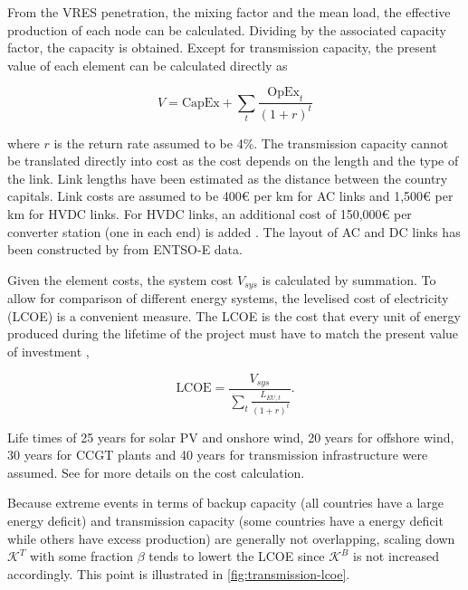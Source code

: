 \documentclass[a4paper, 5p, sort&compress]{elsarticle}%
\newcommand{\paren}[1]{\left(#1\right)}
\begin{document}
From the VRES penetration, the mixing factor and the mean load, the
effective production of each node can be calculated. Dividing by the
associated capacity factor, the capacity is obtained. Except for
transmission capacity, the present value of each element can be
calculated directly as

\begin{equation}
  \label{eq:6}
  V = \text{CapEx} + \sum_{t} \frac{\text{OpEx}_{t}}{\paren{1 + r}^{t}}
\end{equation}

where $r$ is the return rate assumed to be 4\%. The transmission
capacity cannot be translated directly into cost as the cost depends
on the length and the type of the link. Link lengths have been
estimated as the distance between the country capitals. Link costs are
assumed to be 400\euro{}
per km for AC links and 1,500\euro{}
per km for HVDC links. For HVDC links, an additional cost of
150,000\euro{}
per converter station (one in each end) is
added \cite{McKinsey, Schaber, Schaber2}. The layout of AC and
DC links has been constructed by \cite{rolando2014} from ENTSO-E data.


Given the element costs, the system cost $V_{sys}$ is calculated by
summation. To allow for comparison of different energy systems, the
levelised cost of electricity (LCOE) is a convenient measure. The LCOE
is the cost that every unit of energy produced during the lifetime of
the project must have to match the present value of
investment \cite{Short1995},

\begin{equation}
  \label{eq:7}
  \text{LCOE} = \frac{V_{sys}}{\sum_{t} \frac{L_{EU,
        t}}{\paren{1+r}^{t}}} .
\end{equation}

Life times of 25 years for solar PV and onshore wind, 20 years for
offshore wind, 30 years for CCGT plants and 40 years for transmission
infrastructure were assumed. See \cite{Sensitivity} for more details
on the cost calculation.

Because extreme events in terms of backup capacity (all countries have
a large energy deficit) and transmission capacity (some countries have
a energy deficit while others have excess production) are generally
not overlapping, scaling down $\mathcal{K}^{T}$ with some fraction
$\beta$ tends to lowert the LCOE since $\mathcal{K}^{B}$ is not increased
accordingly. This point is illustrated in
\cref{fig:transmission-lcoe}.
\end{document}
